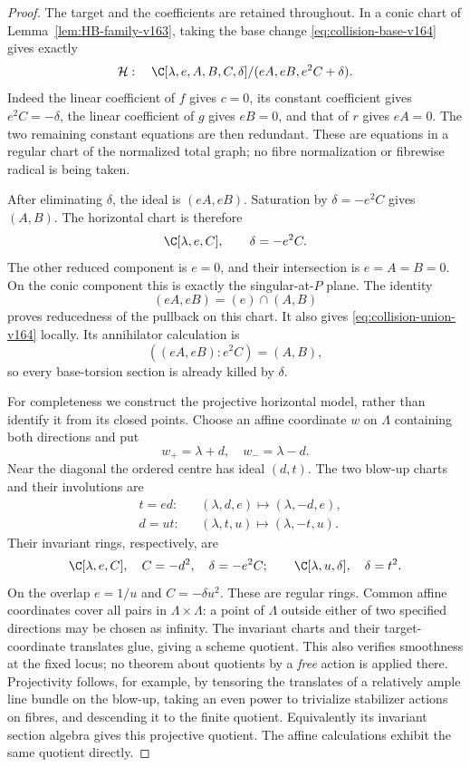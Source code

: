 \begin{proof}
The target and the coefficients are retained throughout. In a conic
chart of Lemma~\ref{lem:HB-family-v163}, taking the base change
\eqref{eq:collision-base-v164} gives exactly
\begin{equation}\label{eq:collision-chart-v164}
 \mathcal H:\quad
 \C[\lambda,e,A,B,C,\delta]/(eA,eB,e^2C+\delta).
\end{equation}
Indeed the linear coefficient of $f$ gives $c=0$, its constant
coefficient gives $e^2C=-\delta$, the linear coefficient of $g$
gives $eB=0$, and that of $r$ gives $eA=0$. The two remaining
constant equations are then redundant. These are equations in a
regular chart of the normalized total graph; no fibre normalization
or fibrewise radical is being taken.

After eliminating $\delta$, the ideal is $(eA,eB)$. Saturation by
$\delta=-e^2C$ gives $(A,B)$. The horizontal chart is therefore
\begin{equation}\label{eq:horizontal-chart-v164}
 \C[\lambda,e,C],\qquad \delta=-e^2C.
\end{equation}
The other reduced component is $e=0$, and their intersection is
$e=A=B=0$. On the conic component this is exactly the singular-at-$P$
plane. The identity
\[
            (eA,eB)=(e)\cap(A,B)
\]
proves reducedness of the pullback on this chart. It also gives
\eqref{eq:collision-union-v164} locally. Its annihilator calculation
is
\[
       ((eA,eB):e^2C)=(A,B),
\]
so every base-torsion section is already killed by $\delta$.

For completeness we construct the projective horizontal model,
rather than identify it from its closed points. Choose an affine
coordinate $w$ on $\Lambda$ containing both directions and put
\[
 w_+=\lambda+d,\quad w_-=\lambda-d.
\]
Near the diagonal the ordered centre has ideal $(d,t)$. The two
blow-up charts and their involutions are
\begin{align*}
 &t=ed: &&(\lambda,d,e)\longmapsto(\lambda,-d,e),\\
 &d=ut: &&(\lambda,t,u)\longmapsto(\lambda,-t,u).
\end{align*}
Their invariant rings, respectively, are
\begin{equation}\label{eq:invariant-charts-v164}
 \C[\lambda,e,C],\quad C=-d^2,\quad\delta=-e^2C;
 \qquad \C[\lambda,u,\delta],\quad\delta=t^2.
\end{equation}
On the overlap $e=1/u$ and $C=-\delta u^2$. These are regular
rings. Common affine coordinates cover all pairs in
$\Lambda\times\Lambda$: a point of $\Lambda$ outside either of
two specified directions may be chosen as infinity. The invariant
charts and their target-coordinate translates glue, giving a
scheme quotient. This also verifies smoothness at the fixed locus;
no theorem about quotients by a \emph{free} action is applied there.
Projectivity follows, for example, by tensoring the translates of
a relatively ample line bundle on the blow-up, taking an even power
to trivialize stabilizer actions on fibres, and descending it to the
finite quotient. Equivalently its invariant section algebra gives
this projective quotient. The affine calculations exhibit the same
quotient directly.


\end{proof}
